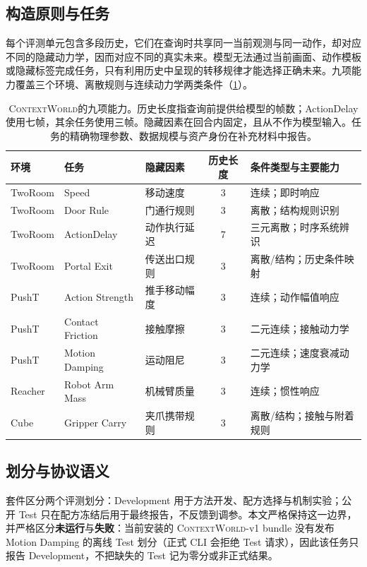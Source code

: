\documentclass[UTF8,zihao=-4,fontset=fandol]{ctexart}
\newcommand{\benchmark}{\textsc{ContextWorld}}
\begin{document}
\subsection{构造原则与任务}

每个评测单元包含多段历史，它们在查询时共享同一当前观测与同一动作，却对应不同的隐藏动力学，因而对应不同的真实未来。模型无法通过当前画面、动作模板或隐藏标签完成任务，只有利用历史中呈现的转移规律才能选择正确未来。九项能力覆盖三个环境、离散规则与连续动力学两类条件（\cref{tab:tasks}）。

\begin{table}[t]
\centering
\small
\caption{\benchmark 的九项能力。历史长度指查询前提供给模型的帧数；ActionDelay 使用七帧，其余任务使用三帧。隐藏因素在回合内固定，且从不作为模型输入。任务的精确物理参数、数据规模与资产身份在补充材料中报告。}
\label{tab:tasks}
\begin{tabular}{@{}lllcl@{}}
\toprule
环境 & 任务 & 隐藏因素 & 历史长度 & 条件类型与主要能力 \\
\midrule
TwoRoom & Speed & 移动速度 & 3 & 连续；即时响应 \\
TwoRoom & Door Rule & 门通行规则 & 3 & 离散；结构规则识别 \\
TwoRoom & ActionDelay & 动作执行延迟 & 7 & 三元离散；时序系统辨识 \\
TwoRoom & Portal Exit & 传送出口规则 & 3 & 离散/结构；历史条件映射 \\
PushT & Action Strength & 推手移动幅度 & 3 & 连续；动作幅值响应 \\
PushT & Contact Friction & 接触摩擦 & 3 & 二元连续；接触动力学 \\
PushT & Motion Damping & 运动阻尼 & 3 & 二元连续；速度衰减动力学 \\
Reacher & Robot Arm Mass & 机械臂质量 & 3 & 连续；惯性响应 \\
Cube & Gripper Carry & 夹爪携带规则 & 3 & 离散/结构；接触与附着规则 \\
\bottomrule
\end{tabular}
\end{table}

\subsection{划分与协议语义}

套件区分两个评测划分：Development 用于方法开发、配方选择与机制实验；公开 Test 只在配方冻结后用于最终报告，不反馈到调参。本文严格保持这一边界，并严格区分\textbf{未运行}与\textbf{失败}：当前安装的 \benchmark-v1 bundle 没有发布 Motion Damping 的离线 Test 划分（正式 CLI 会拒绝 Test 请求），因此该任务只报告 Development，不把缺失的 Test 记为零分或非正式结果。
\end{document}
